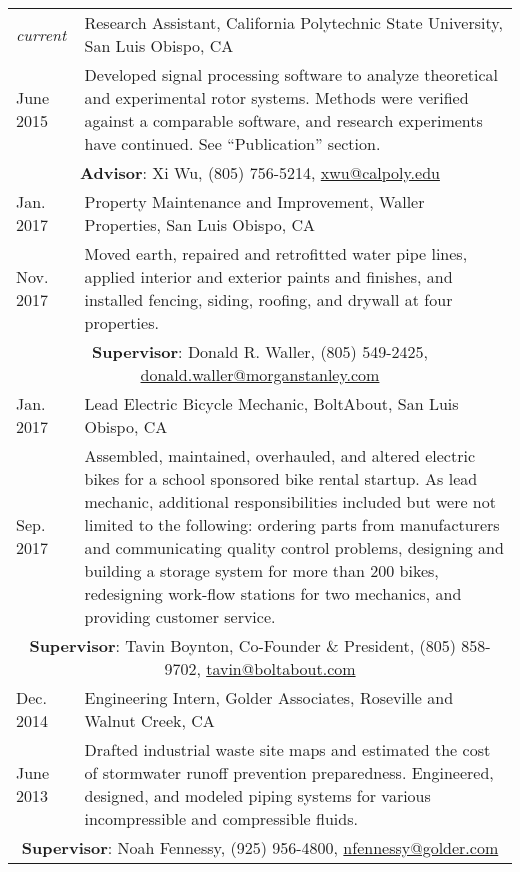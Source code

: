 \documentclass[10pt]{article} %
\newcommand{\catspace}{.4em}
\begin{document}
	\begin{tabular}{p{.6in}|p{5.5in}}
		\emph{current}& Research Assistant, California Polytechnic State University, San Luis Obispo, CA \\
		June 2015& \footnotesize{Developed signal processing software to analyze theoretical and experimental rotor systems. Methods were verified against a comparable software, and research experiments have continued. See ``Publication'' section.}\\
		\multicolumn{2}{c}{\footnotesize{\hfill \textbf{Advisor}: Xi Wu, (805) 756-5214, \href{mailto:xwu@calpoly.edu}{xwu@calpoly.edu}}} \\	[\catspace]	
		
		Jan. 2017& Property Maintenance and Improvement, Waller Properties, San Luis Obispo, CA\\
		Nov. 2017& \footnotesize{Moved earth, repaired and retrofitted water pipe lines, applied interior and exterior paints and finishes, and installed fencing, siding, roofing, and drywall at four properties.}\\
		\multicolumn{2}{c}{\footnotesize{ \hfill \textbf{Supervisor}: Donald R. Waller, (805) 549-2425, \href{mailto:donald.waller@morganstanley.com}{donald.waller@morganstanley.com}}} \\[\catspace]
		
		Jan. 2017& Lead Electric Bicycle Mechanic, BoltAbout, San Luis Obispo, CA\\
		Sep. 2017& \footnotesize{Assembled, maintained, overhauled, and altered electric bikes for a school sponsored bike rental startup. As lead mechanic, additional responsibilities included but were not limited to the following: ordering parts from manufacturers and communicating quality control problems, designing and building a storage system for more than 200 bikes, redesigning work-flow stations for two mechanics, and providing customer service.}\\
		\multicolumn{2}{c}{\footnotesize{\hfill \textbf{Supervisor}: Tavin Boynton, Co-Founder \& President, (805) 858-9702, \href{mailto:tavin@boltabout.com}{tavin@boltabout.com}}} \\[\catspace]
		
		Dec. 2014& Engineering Intern, Golder Associates, Roseville and Walnut Creek, CA \\
		June 2013&\footnotesize{ Drafted industrial waste site maps and estimated the cost of stormwater runoff prevention preparedness. Engineered, designed, and modeled piping systems for various incompressible and compressible fluids. }\\
		\multicolumn{2}{c}{\footnotesize{\hfill \textbf{Supervisor}: Noah Fennessy, (925) 956-4800, \href{nfennessy@golder.com}{nfennessy@golder.com}}} \\	[\catspace]	
		

\end{tabular}
\end{document}
